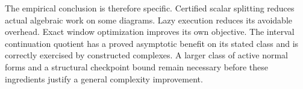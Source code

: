 \begin{table}[htbp]
\centering\small

\caption{Every measured case whose frontier-mass objective strictly improves
under window DP. Full time includes DP and the decision scan.}
\label{tab:ordering}
\end{table}

The empirical conclusion is therefore specific. Certified scalar splitting
reduces actual algebraic work on some diagrams. Lazy execution reduces its
avoidable overhead. Exact window optimization improves its own objective.
The interval continuation quotient has a proved asymptotic benefit on its
stated class and is correctly exercised by constructed complexes. A larger
class of active normal forms and a structural checkpoint bound remain
necessary before these ingredients justify a general complexity improvement.
